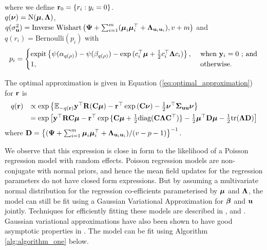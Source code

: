 \noindent 
where we define ${\bf r}_0 = \{ r_i : y_i = 0 \}$. \\
$q({\boldsymbol \nu}) = \text{N}({\boldsymbol \mu}, {\boldsymbol \Lambda})$, \\
$q(\sigma_{{\bf u}}^2) = \text{Inverse Wishart}\left({\boldsymbol \Psi} + \sum_{i=1}^m ({\boldsymbol \mu}_i {\boldsymbol \mu}_i^\top + {\boldsymbol \Lambda}_{{\bf u}_i {\bf u}_i}), v + m \right)$ \mbox{and } \\
$q(r_i) = \text{Bernoulli}{(p_i)}$ with
$$p_i = 
\begin{cases}
\text{expit}\left\{ \psi{(\alpha_{q(\rho)})} - \psi{(\beta_{q(\rho)})} - \exp{(c_i^\top{\boldsymbol\mu}+ \frac{1}{2} c_i^\top {\boldsymbol\Lambda}c_i)} \right\},& \text{ when } {\bf y}_i = 0\text{ ; and}\\
1,& \text{ otherwise.}
\end{cases}$$


The optimal approximation is given in Equation (\ref{eq:optimal_approximation})
for ${\bf r}$ is
\begin{equation}
\label{eq:optimal_approximation}
\begin{array}{rl}
	q({\bf r}) & \propto \exp \left \{ {\mathbb E}_{-q({\bf r})}{\bf y}^\top{\bf R}({\bf C}{\boldsymbol \mu}) - {\bf r}^\top\exp{({\bf C}{\boldsymbol\nu})}-\frac{1}{2} {\boldsymbol \nu}^\top {\boldsymbol\Sigma}_{{\bf u} {\bf u}} {\boldsymbol \nu} \right \}                                                  \\ [1ex]
	       & = \exp{ \left[ {\bf y}^\top{\bf R}{\bf C}{\boldsymbol\mu}- {\bf r}^\top \exp{\{{\bf C}{\boldsymbol\mu}+ \frac{1}{2} \text{diag}({\bf C}{\boldsymbol\Lambda}{\bf C}^\top)\}} - \frac{1}{2} {\boldsymbol\mu}^\top {\bf D}{\boldsymbol\mu}- \frac{1}{2} \text{tr}({\boldsymbol\Lambda}{\bf D}) \right] } 
\end{array}
\end{equation}
\noindent where ${\bf D} = \left\{ ({\boldsymbol \Psi} + \sum_{i=1}^m {\boldsymbol \mu}_i {\boldsymbol \mu}_i^\top + {\boldsymbol \Lambda}_{{\bf u}_i{\bf u}_i}) / (v - p - 1) \right\}^{-1}$. 

We observe that this expression is close in form to the likelihood of a Poisson regression model with random
effects. Poisson regression models are non-conjugate with normal priors, and hence the mean field updates for
the regression parameters do not have closed form expressions. But by assuming a multivariate normal
distribution for the regression co-efficients parameterised by ${\boldsymbol \mu}$ and ${\boldsymbol \Lambda}$, the model can still be
fit using a Gaussian Variational Approximation for ${\boldsymbol \beta}$ and ${\bf u}$ jointly. Techniques for efficiently
fitting these models are described in \cite{Ormerod2012}, \cite{Challis2013} and \cite{Opper2009}. Gaussian
variational approximations have also been shown to have good asymptotic properties in \cite{Sinica2017}. The
model can be fit using Algorithm \ref{alg:algorithm_one} below.

